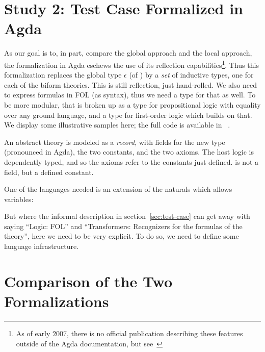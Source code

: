\documentclass[fleqn]{llncs}
\newcommand{\appendixref}[1]
  {\iftoggle{cicm}
    {appendix #1 of \cite{CaretteFarmerArxiv17}}
    {appendix #1}%
  }
\begin{document}
\section{Study 2: Test Case Formalized in Agda}\label{sec:agda}

As our goal is to, in part, compare the global approach and the local
approach, the formalization in Agda eschews the use of its reflection
capabilities\footnote{As of early $2007$, there is no official
  publication describing these features outside of the Agda
  documentation, but see~\cite{VanDerWalt12,VanDerWaltSwierstra12}}.
Thus this formalization replaces the global type $\epsilon$ (of
{\churchuqe}) by a \emph{set} of inductive types, one for each of the
biform theories.  This is still reflection, just hand-rolled.  We also
need to express formulas in FOL (as syntax), thus we need a type for
that as well.  To be more modular, that is broken up as a type for
propositional logic with equality over any ground language, and a type
for first-order logic which builds on that.  We display some
illustrative samples here; the full code is available
in~\appendixref{B}.

\iffalse
and at~\cite{agda-code}.
\fi

An abstract theory is modeled as a \emph{record}, with fields for the
new type (pronounced  in Agda), the two constants,
and the two axioms.  The host logic is dependently typed, and so the
axioms refer to the constants just defined.   is not
a field, but a defined constant.

One of the languages needed is an extension of the naturals which
allows variables:



But where the informal description in section~\ref{sec:test-case} can
get away with saying ``Logic: FOL'' and ``Transformers: Recognizers for
the formulas of the theory'', here we need to be very explicit.  To do
so, we need to define some language infrastructure.







\section{Comparison of the Two Formalizations}\label{sec:comparison}
\end{document}
